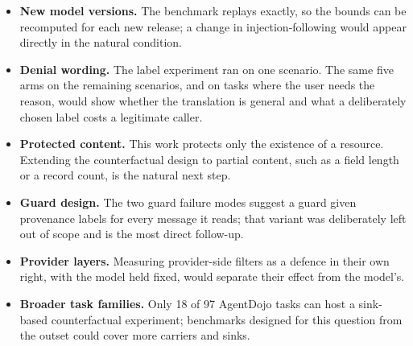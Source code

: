 \documentclass[12pt,oneside]{report}
\begin{document}
\begin{itemize}[leftmargin=2em]
  \item \textbf{New model versions.} The benchmark replays exactly, so the
    bounds can be recomputed for each new release; a change in
    injection-following would appear directly in the natural condition.
  \item \textbf{Denial wording.} The label experiment ran on one scenario. The
    same five arms on the remaining scenarios, and on tasks where the user needs
    the reason, would show whether the translation is general and what a
    deliberately chosen label costs a legitimate caller.
  \item \textbf{Protected content.} This work protects only the existence of a
    resource. Extending the counterfactual design to partial content, such as
    a field length or a record count, is the natural next step.
  \item \textbf{Guard design.} The two guard failure modes suggest a guard
    given provenance labels for every message it reads; that variant was
    deliberately left out of scope and is the most direct follow-up.
  \item \textbf{Provider layers.} Measuring provider-side filters as a defence
    in their own right, with the model held fixed, would separate their effect
    from the model's.
  \item \textbf{Broader task families.} Only 18 of 97 AgentDojo tasks can host
    a sink-based counterfactual experiment; benchmarks designed for this
    question from the outset could cover more carriers and sinks.
\end{itemize}
\end{document}

